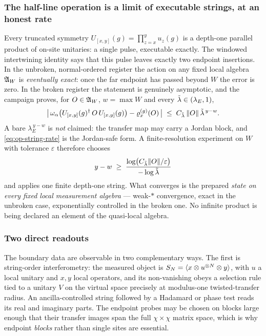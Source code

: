 \subsubsection*{The half-line operation is a limit of executable strings, at an
honest rate}

Every truncated symmetry $U_{[x,y]}(g)=\prod_{z=x}^{y}u_z(g)$ is a depth-one
parallel product of on-site unitaries: a single pulse, executable exactly. The
windowed intertwining identity says that this pulse leaves exactly two
endpoint insertions. In the unbroken, normal-ordered register the action on
any fixed local algebra $\mathfrak{A}_W$ is \emph{eventually exact}: once the far
endpoint has passed beyond $W$ the error is zero. In the broken register the
statement is genuinely asymptotic, and the campaign proves, for
$O\in\mathfrak{A}_W$, $w=\max W$ and every $\tilde{\lambda}\in(\lambda_E,1)$,
\begin{equation}
  \bigl|\,\omega_\alpha\bigl(U_{[x,y]}(g)^{\dagger}\,O\,U_{[x,y]}(g)\bigr)
        -\varrho^{(g)}_{x}(O)\,\bigr|
  \;\le\; C_{\tilde{\lambda}}\,\lVert O\rVert\,\tilde{\lambda}^{\,y-w}.
  \label{eq:op-string-rate}
\end{equation}
A bare $\lambda_E^{\,y-w}$ is \emph{not} claimed: the transfer map may carry a
Jordan block, and \eqref{eq:op-string-rate} is the Jordan-safe form. A
finite-resolution experiment on $W$ with tolerance $\varepsilon$ therefore
chooses
\begin{equation}
  y-w \;\ge\; \frac{\log\bigl(C_{\tilde{\lambda}}\lVert O\rVert/\varepsilon\bigr)}
                   {-\log\tilde{\lambda}}
\end{equation}
and applies one finite depth-one string. What converges is the prepared
\emph{state on every fixed local measurement algebra} --- weak-$*$
convergence, exact in the unbroken case, exponentially controlled in the
broken one. No infinite product is being declared an element of the
quasi-local algebra.

\subsubsection*{Two direct readouts}

The boundary data are observable in two complementary ways. The first is
string-order interferometry: the measured object is
$S_N=\langle x\otimes u^{\otimes N}\otimes y\rangle$, with $u$ a local unitary and
$x,y$ local operators, and its non-vanishing obeys a selection rule tied to a
unitary $V$ on the virtual space precisely at modulus-one twisted-transfer
radius. An ancilla-controlled string followed by a Hadamard or phase test
reads its real and imaginary parts. The endpoint probes may be chosen on
blocks large enough that their transfer images span the full $\chi\times\chi$
matrix space, which is why endpoint \emph{blocks} rather than single sites are
essential.

